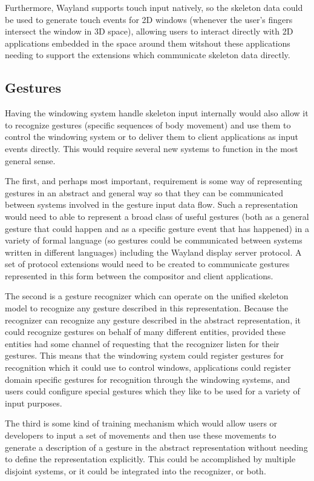 Furthermore, Wayland supports touch input natively, so the skeleton data could be used to generate touch events for 2D windows (whenever the user's fingers intersect the window in 3D space), allowing users to interact directly with 2D applications embedded in the space around them witshout these applications needing to support the extensions which communicate skeleton data directly.

\subsection{Gestures}

Having the windowing system handle skeleton input internally would also allow it to recognize gestures (specific sequences of body movement) and use them to control the windowing system or to deliver them to client applications as input events directly. This would require several new systems to function in the most general sense. 

The first, and perhaps most important, requirement is some way of representing gestures in an abstract and general way so that they can be communicated between systems involved in the gesture input data flow. Such a representation would need to able to represent a broad class of useful gestures (both as a general gesture that could happen and as a specific gesture event that has happened) in a variety of formal language (so gestures could be communicated between systems written in different languages) including the Wayland display server protocol. A set of protocol extensions would need to be created to communicate gestures represented in this form between the compositor and client applications.

The second is a gesture recognizer which can operate on the unified skeleton model to recognize any gesture described in this representation. Because the recognizer can recognize any gesture described in the abstract representation, it could recognize gestures on behalf of many different entities, provided these entities had some channel of requesting that the recognizer listen for their gestures. This means that the windowing system could register gestures for recognition which it could use to control windows, applications could register domain specific gestures for recognition through the windowing systems, and users could configure special gestures which they like to be used for a variety of input purposes.

The third is some kind of training mechanism which would allow users or developers to input a set of movements and then use these movements to generate a description of a gesture in the abstract representation without needing to define the representation explicitly. This could be accomplished by multiple disjoint systems, or it could be integrated into the recognizer, or both.

